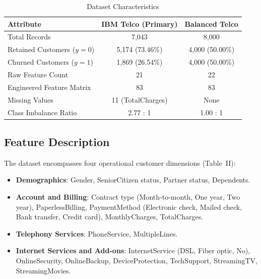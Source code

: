 \documentclass[conference]{IEEEtran}
\begin{document}
\begin{table}[htbp]
\caption{Dataset Characteristics}
\label{tab:dataset}
\centering
\begin{tabular}{lcc}
\toprule
\textbf{Attribute} & \textbf{IBM Telco (Primary)} & \textbf{Balanced Telco} \\
\midrule
Total Records & 7,043 & 8,000 \\
Retained Customers ($y=0$) & 5,174 (73.46\%) & 4,000 (50.00\%) \\
Churned Customers ($y=1$) & 1,869 (26.54\%) & 4,000 (50.00\%) \\
Raw Feature Count & 21 & 22 \\
Engineered Feature Matrix & 83 & 83 \\
Missing Values & 11 (TotalCharges) & None \\
Class Imbalance Ratio & 2.77 : 1 & 1.00 : 1 \\
\bottomrule
\end{tabular}
\end{table}

\subsection{Feature Description}
The dataset encompasses four operational customer dimensions (Table~II):
\begin{itemize}
    \item \textbf{Demographics}: Gender, SeniorCitizen status, Partner status, Dependents.
    \item \textbf{Account and Billing}: Contract type (Month-to-month, One year, Two year), PaperlessBilling, PaymentMethod (Electronic check, Mailed check, Bank transfer, Credit card), MonthlyCharges, TotalCharges.
    \item \textbf{Telephony Services}: PhoneService, MultipleLines.
    \item \textbf{Internet Services and Add-ons}: InternetService (DSL, Fiber optic, No), OnlineSecurity, OnlineBackup, DeviceProtection, TechSupport, StreamingTV, StreamingMovies.
\end{itemize}
\end{document}
